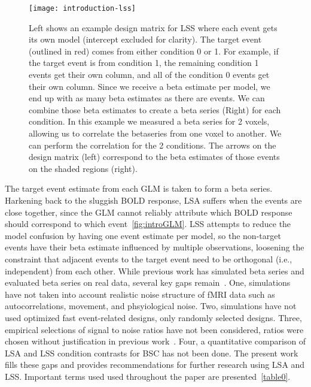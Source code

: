 \documentclass[10pt,letterpaper]{article}
\begin{document}
\begin{figure}[H]
  \centering
  \texttt{[image: introduction-lss]}
  \caption{
    Left shows an example design matrix for LSS where each event gets its own model
    (intercept excluded for clarity).
    The target event (outlined in red) comes from either condition 0 or 1.
    For example, if the target event is from condition 1, the remaining condition 1 events
    get their own column, and all of the condition 0 events get their own column.
    Since we receive a beta estimate per model, we end up with as many beta estimates as there
    are events.
    We can combine those beta estimates to create a beta series (Right) for each condition.
    In this example we measured a beta series for 2 voxels, allowing us to
    correlate the betaseries from one voxel to another.
    We can perform the correlation for the 2 conditions.
    The arrows on the design matrix (left) correspond to the beta estimates of those events
    on the shaded regions (right).
  }
  \label{fig:introlss}
\end{figure}

The target event estimate from each GLM is taken to form a beta series.
Harkening back to the sluggish BOLD response, LSA suffers when the events are close together,
since the GLM cannot reliably attribute which BOLD response should correspond to which event~\ref{fig:introGLM}.
LSS attempts to reduce the model confusion by having one event estimate per model,
so the non-target events have their beta estimate influenced by multiple observations, loosening the
constraint that adjacent events to the target event need to be orthogonal (i.e., independent) from each other.
While previous work has simulated beta series and evaluated beta series on real data,
several key gaps remain~\cite{Mumford2014a,Mumford2012,Turner2012a,Abdulrahman2016,Cisler2012,Arco2018}.
One, simulations have not taken into account realistic noise structure of fMRI data such as autocorrelations, movement, and phsyiological noise.
Two, simulations have not used optimized fast event-related designs, only randomly selected designs. 
Three, empirical selections of signal to noise ratios have not been considered,
ratios were chosen without justification in previous work~\cite{Abdulrahman2016,Mumford2012}.
Four, a quantitative comparison of LSA and LSS condition contrasts for BSC has not been done.
The present work fills these gaps and provides recommendations for further research
using LSA and LSS.
Important terms used used throughout the paper are presented~\ref{table0}.
\end{document}
